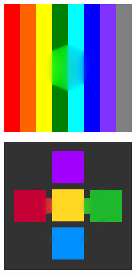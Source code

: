 \documentclass[hidelinks, a4paper,12pt]{article}
\numberwithin{equation}{section}							%
\numberwithin{equation}{section}
\begin{document}
{\begin{figure}[H]
\begin{subfigure}{0.4\linewidth}
		\includegraphics[width=0.8\linewidth]{images/result_ex1/fixpoint03.png}			
	\end{subfigure}
	\begin{subfigure}{0.4\linewidth}
		\centering
		\includegraphics[width=0.8\linewidth]{images/result_ex1/fixpoint04.png}			
	\end{subfigure}
	\begin{subfigure}{0.4\linewidth}
		\centering

\end{subfigure}
\end{figure}}
\end{document}
